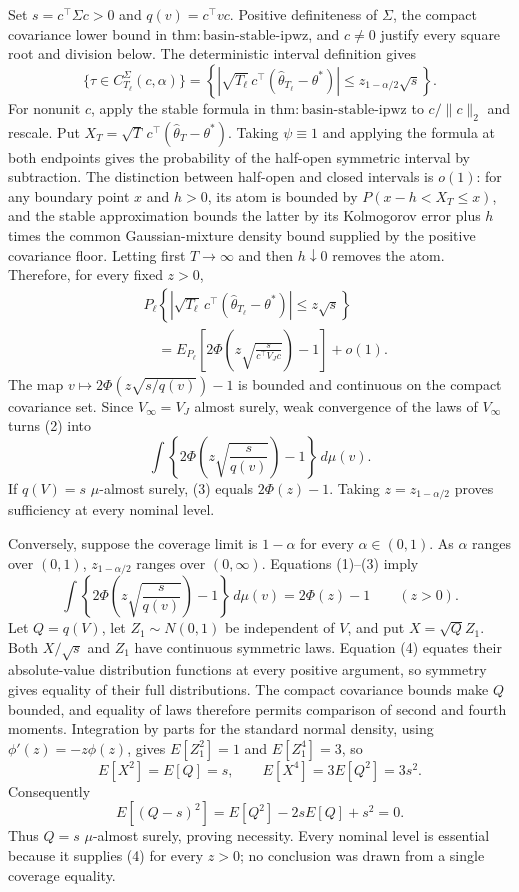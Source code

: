 Set \(s=c^\top\Sigma c>0\) and \(q(v)=c^\top vc\). Positive definiteness of \(\Sigma\), the compact covariance lower bound in \(\mathrm{thm:basin\text{-}stable\text{-}ipwz}\), and \(c\ne0\) justify every square root and division below. The deterministic interval definition gives
\[
 \{\tau\in C_{T_\ell}^{\Sigma}(c,\alpha)\}
 =\left\{\left|\sqrt{T_\ell}\,c^\top(\widehat\theta_{T_\ell}-\theta^*)\right|
 \le z_{1-\alpha/2}\sqrt s\right\}.
\tag{1}
\]
For nonunit \(c\), apply the stable formula in \(\mathrm{thm:basin\text{-}stable\text{-}ipwz}\) to \(c/\|c\|_2\) and rescale. Put \(X_T=\sqrt T\,c^\top(\widehat\theta_T-\theta^*)\). Taking \(\psi\equiv1\) and applying the formula at both endpoints gives the probability of the half-open symmetric interval by subtraction. The distinction between half-open and closed intervals is \(o(1)\): for any boundary point \(x\) and \(h>0\), its atom is bounded by \(P(x-h<X_T\le x)\), and the stable approximation bounds the latter by its Kolmogorov error plus \(h\) times the common Gaussian-mixture density bound supplied by the positive covariance floor. Letting first \(T\to\infty\) and then \(h\downarrow0\) removes the atom. Therefore, for every fixed \(z>0\),
\[
\begin{aligned}
 &P_\ell\!\left\{\left|\sqrt{T_\ell}\,c^\top
 (\widehat\theta_{T_\ell}-\theta^*)\right|\le z\sqrt s\right\}\\
 &\quad=E_{P_\ell}\!\left[2\Phi\!\left(z\sqrt{\frac{s}{c^\top V_Jc}}\right)-1\right]+o(1).
\end{aligned}
\tag{2}
\]
The map \(v\mapsto2\Phi(z\sqrt{s/q(v)})-1\) is bounded and continuous on the compact covariance set. Since \(V_\infty=V_J\) almost surely, weak convergence of the laws of \(V_\infty\) turns (2) into
\[
 \int\left\{2\Phi\!\left(z\sqrt{\frac{s}{q(v)}}\right)-1\right\}\,d\mu(v).
\tag{3}
\]
If \(q(V)=s\) \(\mu\)-almost surely, (3) equals \(2\Phi(z)-1\). Taking \(z=z_{1-\alpha/2}\) proves sufficiency at every nominal level.

Conversely, suppose the coverage limit is \(1-\alpha\) for every \(\alpha\in(0,1)\). As \(\alpha\) ranges over \((0,1)\), \(z_{1-\alpha/2}\) ranges over \((0,\infty)\). Equations (1)--(3) imply
\[
 \int\left\{2\Phi\!\left(z\sqrt{\frac{s}{q(v)}}\right)-1\right\}\,d\mu(v)
 =2\Phi(z)-1\qquad(z>0).
\tag{4}
\]
Let \(Q=q(V)\), let \(Z_1\sim N(0,1)\) be independent of \(V\), and put \(X=\sqrt QZ_1\). Both \(X/\sqrt s\) and \(Z_1\) have continuous symmetric laws. Equation (4) equates their absolute-value distribution functions at every positive argument, so symmetry gives equality of their full distributions. The compact covariance bounds make \(Q\) bounded, and equality of laws therefore permits comparison of second and fourth moments. Integration by parts for the standard normal density, using \(\phi'(z)=-z\phi(z)\), gives \(E[Z_1^2]=1\) and \(E[Z_1^4]=3\), so
\[
 E[X^2]=E[Q]=s,
 \qquad E[X^4]=3E[Q^2]=3s^2.
\tag{5}
\]
Consequently
\[
 E[(Q-s)^2]=E[Q^2]-2sE[Q]+s^2=0.
\tag{6}
\]
Thus \(Q=s\) \(\mu\)-almost surely, proving necessity. Every nominal level is essential because it supplies (4) for every \(z>0\); no conclusion was drawn from a single coverage equality.


